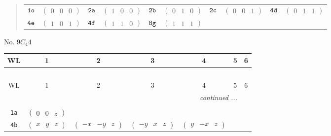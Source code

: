 \documentclass[fleqn,9pt,landscape]{jsarticle}
\begin{document}
\begin{quote}
\begin{tabular}{cccccccccc}
$ {\tt 1o} $ & $ \begin{pmatrix} 0 & 0 & 0 \end{pmatrix} $ & $ {\tt 2a} $ & $ \begin{pmatrix} 1 & 0 & 0 \end{pmatrix} $ & $ {\tt 2b} $ & $ \begin{pmatrix} 0 & 1 & 0 \end{pmatrix} $ & $ {\tt 2c} $ & $ \begin{pmatrix} 0 & 0 & 1 \end{pmatrix} $ & $ {\tt 4d} $ & $ \begin{pmatrix} 0 & 1 & 1 \end{pmatrix} $ \\
$ {\tt 4e} $ & $ \begin{pmatrix} 1 & 0 & 1 \end{pmatrix} $ & $ {\tt 4f} $ & $ \begin{pmatrix} 1 & 1 & 0 \end{pmatrix} $ & $ {\tt 8g} $ & $ \begin{pmatrix} 1 & 1 & 1 \end{pmatrix} $ & $  $ & $  $ & $  $ & $  $
\end{tabular}
\end{quote}
\newpage
No. 9\quad$C_{4}$\quad$4$\quad[ tetragonal ]
\begin{center}
\renewcommand{\arraystretch}{1.2}
\begin{longtable}{ccccccc}
 \hline \hline
WL & 1 & 2 & 3 & 4 & 5 & 6 \\ \hline \endfirsthead

\multicolumn{6}{l}{\tablename\ \thetable{}} \\
 \hline \hline
WL & 1 & 2 & 3 & 4 & 5 & 6 \\ \hline \endhead

 \hline \hline
\multicolumn{6}{r}{\footnotesize\it continued ...} \\ \endfoot

 \hline \hline
\multicolumn{6}{r}{} \\ \endlastfoot

{\tt 1a} & $ \begin{pmatrix} 0 & 0 & z \end{pmatrix} $ & $  $ & $  $ & $  $ \\ \hline
{\tt 4b} & $ \begin{pmatrix} x & y & z \end{pmatrix} $ & $ \begin{pmatrix} - x & - y & z \end{pmatrix} $ & $ \begin{pmatrix} - y & x & z \end{pmatrix} $ & $ \begin{pmatrix} y & - x & z \end{pmatrix} $ \\
\end{longtable}
\end{center}
\end{document}
